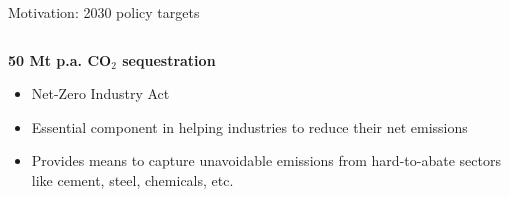 \documentclass[10pt,aspectratio=169,dvipsnames]{beamer}
\begin{document}
\begin{frame}{Motivation: 2030 policy targets}
\begin{columns}[T]
    \begin{column}{.3\textwidth}
        \begin{minipage}[t][.45\textheight]{\linewidth}
            \begin{exampleblock}{\textbf{50 Mt p.a. CO$_2$ sequestration}}
                \begin{itemize}
                  \item \alert{Net-Zero Industry Act}
                  \item Essential component in helping industries to reduce their net emissions
                  \item Provides means to capture unavoidable emissions from hard-to-abate sectors like cement, steel, chemicals, etc.
                \end{itemize}
            \end{exampleblock}
        \end{minipage}
    \end{column}
  \end{columns}

  \vspace{1.3cm}

\end{frame}
\end{document}
